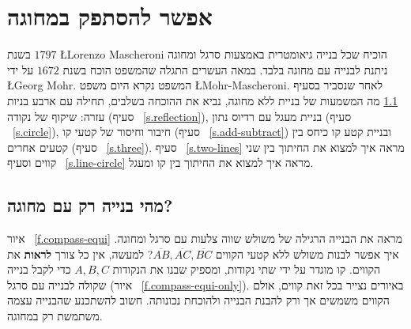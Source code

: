 


\chapter{אפשר להסתפק במחוגה}\label{c.compass}


בשנת
$1797$
\L{Lorenzo Mascheroni}
הוכיח שכל בנייה גיאומטרית באמצעות סרגל ומחוגה ניתנת לבנייה עם מחוגה בלבד. במאה העשרים התגלה שהמשפט הוכח בשנת
$1672$
על ידי
\L{Georg Mohr}.
המשפט נקרא היום משפט
\L{Mohr-Mascheroni}.
לאחר שנסביר בסעיף%
~\ref{s.compass-what}
מה המשמעות של בניית ללא מחוגה, נביא את ההוכחה בשלבים, תחילה עם ארבע בניות עזרה: שיקוף של נקודה (סעיף%
~\ref{s.reflection}),
בניית מעגל עם רדיוס נתון (סעיף%
~\ref{s.circle}),
חיבור וחיסור של קטעי קו (סעיף%
~\ref{s.add-subtract})
ובניית קטע קו כיחס בין קטעים אחרים (סעיף%
~\ref{s.three}).
סעיף%
~\ref{s.two-lines}
מראה איך למצוא את החיתוך בין שני קווים וסעיף%
~\ref{s.line-circle}
מראה איך למצוא את החיתוך בין קו ומעגל.


\section{מהי בנייה רק עם מחוגה?}\label{s.compass-what}

איור%
~\ref{f.compass-equi}
מראה את הבנייה הרגילה של משולש שווה צלעות עם סרגל ומחוגה. איך אפשר לבנות משולש ללא קטעי הקווים
$\overline{AB},\overline{AC},\overline{BC}$?
למעשה, אין כל צורך
\textbf{לראות}
את הקווים. קו מוגדר על ידי שתי נקודות, ומספיק שבנו את הנקודות 
$A,B,C$
 כדי לקבל בנייה שקולה לבנייה עם סרגל 
(איור%
~\ref{f.compass-equi-only}).
באיורים נצייר בכל זאת קווים, אולם הקווים משמשים אך ורק להבנת הבנייה ולהוכחת נכונותה. חשוב להשתכנע שהבנייה עצמה משתמשת רק במחוגה.

